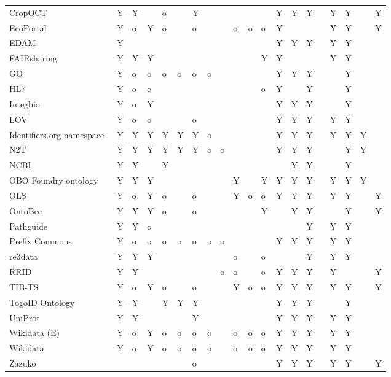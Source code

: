 \begin{table}
\begin{tabular}{llllllllllllllllllll}
CropOCT~\cite{Arnaud2020} & Y & Y &  & o &  & Y &  &  &  &  &  & Y & Y & Y &  & Y & Y &  & Y \\
EcoPortal~\cite{Kechagioglou2021} & Y & o & Y & o &  & o &  &  & o & o & o & Y &  &  &  & Y & Y &  & Y \\
EDAM~\cite{Ison2013} & Y &  &  &  &  &  &  &  &  &  &  & Y & Y & Y &  & Y & Y &  &  \\
FAIRsharing~\cite{Sansone2019} & Y & Y & Y &  &  &  &  &  &  &  & Y & Y &  &  &  & Y & Y &  &  \\
GO~\cite{TheGeneOntologyConsortium2019} & Y & o & o & o & o & o & o &  &  &  &  & Y & Y & Y &  &  & Y &  &  \\
HL7~\cite{Bender2013} & Y & o & o &  &  &  &  &  &  &  & o & Y &  & Y &  &  & Y &  &  \\
Integbio & Y & o & Y &  &  &  &  &  &  &  &  & Y & Y & Y &  &  & Y &  &  \\
LOV & Y & o & o &  &  & o &  &  &  &  &  & Y & Y & Y &  & Y & Y &  &  \\
Identifiers.org namespace~\cite{Juty2012} & Y & Y & Y & Y & Y & Y & o &  &  &  &  & Y & Y & Y &  & Y & Y & Y &  \\
N2T~\cite{Wimalaratne2018} & Y & Y & Y & Y & Y & Y & o & o &  &  &  & Y & Y & Y &  &  & Y & Y &  \\
NCBI~\cite{Clark2016} & Y & Y &  & Y &  &  &  &  &  &  &  &  & Y & Y &  &  & Y &  &  \\
OBO Foundry ontology~\cite{Jackson2021} & Y & Y & Y &  &  &  &  &  & Y &  & Y & Y & Y & Y &  & Y & Y & Y &  \\
OLS~\cite{Cote2006a} & Y & o & Y & o &  & o &  &  & Y & o & o & Y & Y & Y &  & Y & Y &  & Y \\
OntoBee~\cite{Ong2017} & Y & Y & Y & o &  & o &  &  &  &  & Y &  & Y & Y &  &  & Y &  & Y \\
Pathguide & Y & Y & o &  &  &  &  &  &  &  &  &  &  & Y &  & Y & Y &  &  \\
Prefix Commons~\cite{prefixcommons} & Y & o & o & o & o & o & o & o &  &  &  & Y & Y & Y &  & Y & Y &  &  \\
re3data~\cite{Pampel2013} & Y & Y & Y &  &  &  &  &  & o &  & o &  &  & Y &  & Y & Y &  &  \\
RRID & Y & Y &  &  &  &  &  & o & o &  & o & Y & Y & Y &  & Y &  &  & Y \\
TIB-TS & Y & o & Y & o &  & o &  &  & Y & o & o & Y & Y & Y &  & Y & Y &  & Y \\
TogoID Ontology & Y & Y &  & Y & Y & Y &  &  &  &  &  & Y & Y & Y &  &  & Y &  &  \\
UniProt~\cite{Bateman2021} & Y & Y &  &  &  & Y &  &  &  &  &  & Y & Y & Y &  & Y & Y &  &  \\
Wikidata (E)~\cite{Waagmeester2020} & Y & o & Y & o & o & o & o &  & o & o & o & Y & Y & Y &  & Y & Y &  &  \\
Wikidata~\cite{Waagmeester2020} & Y & o & Y & o & o & o & o &  & o & o & o & Y & Y & Y &  & Y & Y &  &  \\
Zazuko &  &  &  &  &  & o &  &  &  &  &  & Y & Y & Y &  & Y & Y &  & Y \\
\bottomrule
\end{tabular}
\end{table}
